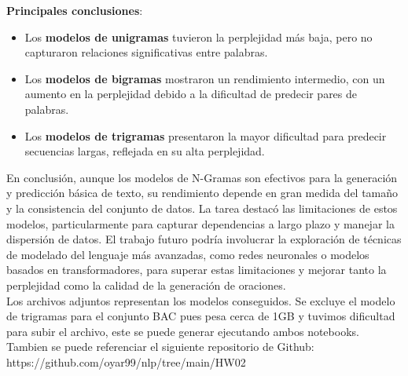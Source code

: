 \documentclass[11pt,english]{article}
\theoremstyle{plain}
\begin{document}
\textbf{Principales conclusiones}:
\begin{itemize}
    \item Los \textbf{modelos de unigramas} tuvieron la perplejidad más baja, pero no capturaron relaciones significativas entre palabras.
    \item Los \textbf{modelos de bigramas} mostraron un rendimiento intermedio, con un aumento en la perplejidad debido a la dificultad de predecir pares de palabras.
    \item Los \textbf{modelos de trigramas} presentaron la mayor dificultad para predecir secuencias largas, reflejada en su alta perplejidad.
\end{itemize}

\noindent En conclusión, aunque los modelos de N-Gramas son efectivos para la generación y predicción básica de texto, su rendimiento depende en gran medida del tamaño y la consistencia del conjunto de datos. La tarea destacó las limitaciones de estos modelos, particularmente para capturar dependencias a largo plazo y manejar la dispersión de datos. El trabajo futuro podría involucrar la exploración de técnicas de modelado del lenguaje más avanzadas, como redes neuronales o modelos basados en transformadores, para superar estas limitaciones y mejorar tanto la perplejidad como la calidad de la generación de oraciones. \\

\noindent Los archivos adjuntos representan los modelos conseguidos. Se excluye el modelo de trigramas para el conjunto BAC pues pesa cerca de 1GB y tuvimos dificultad para subir el archivo, este se puede generar ejecutando ambos notebooks. Tambien se puede referenciar el siguiente repositorio de Github: https://github.com/oyar99/nlp/tree/main/HW02
\end{document}
